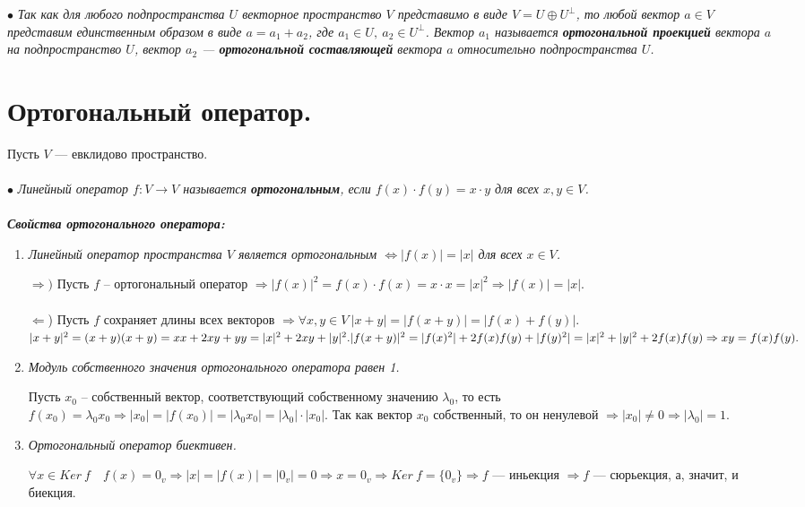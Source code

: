 $\bullet$ \textit{Так как для любого подпространства $U$ векторное пространство $V$ представимо в виде $V = U\oplus U^\perp$, то любой вектор $a\in V$ представим единственным образом в виде $a = a_1 + a_2$, где $a_1\in U,\ a_2 \in U^\perp$. Вектор $a_1$ называется \textbf{ортогональной проекцией} вектора $a$ на подпространство $U$, вектор $a_2$ --- \textbf{ортогональной составляющей} вектора $a$ относительно подпространства $U$.}










\section{Ортогональный оператор.}
Пусть $V$ --- евклидово пространство.\\\\
$\bullet$ \textit{Линейный оператор $f: V \to V$ называется \textbf{ортогональным}, если $f(x)\cdot f(y) = x\cdot y$ для всех $x,y \in V$.}\\\\
\textit{ \textbf{Свойства ортогонального оператора:}}\begin{enumerate}
	\item \textit{Линейный оператор пространства $V$ является ортогональным $\Longleftrightarrow |f(x)| = |x|$ для всех $x \in V$.}\begin{Proof}
		$\Rightarrow)$ Пусть $f$ -- ортогональный оператор $\Rightarrow |f(x)|^2 = f(x) \cdot f(x) = x \cdot x = |x|^2\Rightarrow |f(x)| = |x|.$\\\\
		$\Leftarrow$) Пусть $f$ сохраняет длины всех векторов $\Rightarrow \forall x,y \in V\ |x + y| = |f(x+y)| = |f(x) + f(y)|. $\\
		$|x + y|^2 = (x+y)(x+y) = x x + 2xy + y y = |x|^2 + 2xy + |y|^2.\\ |f(x + y)|^2  =  |f(x)^2|+ 2 f(x)f(y) + |f(y)^2| = |x|^2 + |y|^2 + 2f(x)f(y) \Rightarrow xy = f(x)f(y).$
	\end{Proof}
	\item \textit{Модуль собственного значения ортогонального оператора равен 1.}
	\begin{Proof}
		Пусть $x_0$ -- собственный вектор, соответствующий собственному значению $\lambda_{0}$, то есть $f(x_0) = \lambda_{0}x_0 \Rightarrow |x_0| = |f(x_0)| = |\lambda_{0}x_0| = |\lambda_{0}|\cdot|x_0|$. Так как вектор $x_0$ собственный, то он ненулевой $\Rightarrow |x_0| \ne 0\Rightarrow|\lambda_0| = 1$.
	\end{Proof}
	\item \textit{Ортогональный оператор биективен.}\begin{Proof}
		$\forall x \in Ker\ f \quad f(x) = 0_v \Rightarrow |x| = |f(x)| = |0_{v}| = 0 \Rightarrow x= 0_{v} \Rightarrow Ker\ f = \{ 0_{v} \}  \Rightarrow f$ --- иньекция $ \Rightarrow f$ --- сюрьекция, а, значит, и биекция.
	\end{Proof}
\end{enumerate}
